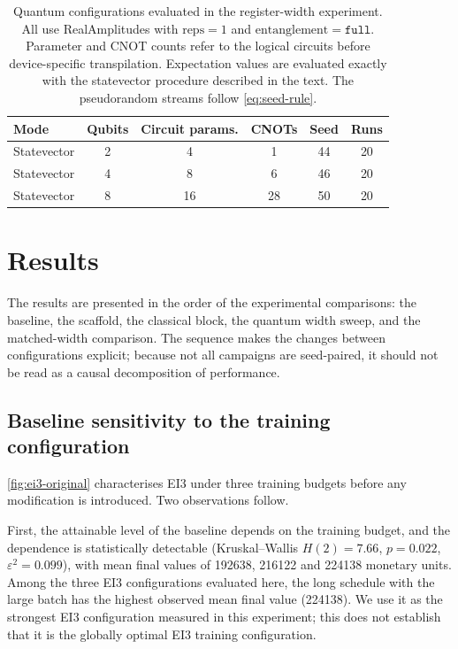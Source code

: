 \documentclass[aps,floatfix,superscriptaddress,twocolumn,tightenlines,amsmath,amssymb,nofootinbib,10pt,longbibliography,prl]{revtex4-2}
\begin{document}
\begin{table}[htbp]
  \centering
  \caption{Quantum configurations evaluated in the register-width experiment. All use RealAmplitudes
  with $\mathrm{reps}=1$ and $\mathrm{entanglement}=\texttt{full}$. Parameter and CNOT
  counts refer to the logical circuits before device-specific transpilation. Expectation
  values are evaluated exactly with the statevector procedure described in the text. The
  pseudorandom streams follow \ref{eq:seed-rule}.}
  \label{tab:quantum-configs}
  \begin{tabular}{lccccc}
    \toprule
    Mode & Qubits & Circuit params. & CNOTs & Seed & Runs \\
    \midrule
    Statevector & 2 & 4  & 1  & 44 & 20 \\
    Statevector & 4 & 8  & 6  & 46 & 20 \\
    Statevector & 8 & 16 & 28 & 50 & 20 \\
    \bottomrule
  \end{tabular}
\end{table}

\section{Results}
\label{sec:results}

The results are presented in the order of the experimental comparisons: the baseline, the
scaffold, the classical block, the quantum width sweep, and the matched-width comparison.
The sequence makes the changes between configurations explicit; because not all campaigns
are seed-paired, it should not be read as a causal decomposition of performance.

\FloatBarrier
\subsection{Baseline sensitivity to the training configuration}
\label{subsec:res-baseline}

\ref{fig:ei3-original} characterises EI3 under three training budgets before
any modification is introduced. Two observations follow.

First, the attainable level of the baseline depends on the training budget, and the
dependence is statistically detectable (Kruskal--Wallis $H(2) = 7.66$,
$p = 0.022$, $\varepsilon^2 = 0.099$), with mean final values of \num{192638},
\num{216122} and \num{224138} monetary units. Among the three EI3 configurations evaluated here, the long schedule with the
large batch has the highest observed mean final value (\num{224138}). We use it as the
strongest EI3 configuration measured in this experiment; this does not establish that it is
the globally optimal EI3 training configuration.
\end{document}
